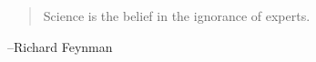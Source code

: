 \documentclass{exam}
\begin{document}
\begin{description}

    \end{description}

  \else
    \vspace{1.5 cm}
    \begin{quote}
      \begin{em}
        Science is the belief in the ignorance of experts. 
      \end{em}
    \end{quote}

    \hspace{1 cm} --Richard Feynman


  \fi
\end{document}
